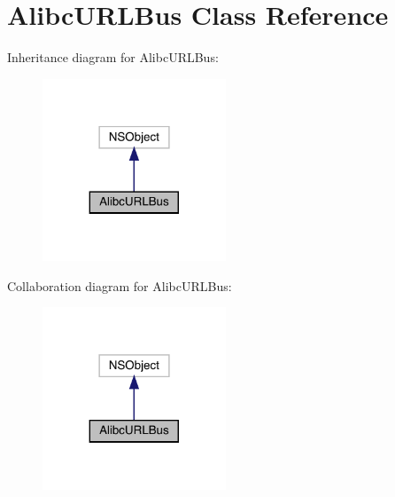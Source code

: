 \hypertarget{interface_alibc_u_r_l_bus}{}\section{Alibc\+U\+R\+L\+Bus Class Reference}
\label{interface_alibc_u_r_l_bus}


Inheritance diagram for Alibc\+U\+R\+L\+Bus\+:\nopagebreak
\begin{figure}[H]
\begin{center}
\leavevmode
\includegraphics[width=155pt]{interface_alibc_u_r_l_bus__inherit__graph}
\end{center}
\end{figure}


Collaboration diagram for Alibc\+U\+R\+L\+Bus\+:\nopagebreak
\begin{figure}[H]
\begin{center}
\leavevmode
\includegraphics[width=155pt]{interface_alibc_u_r_l_bus__coll__graph}
\end{center}
\end{figure}

